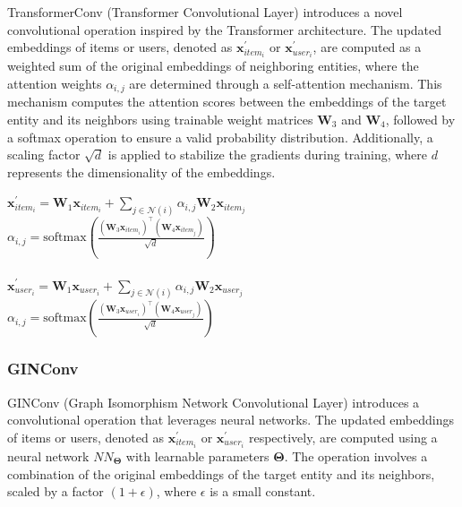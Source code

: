 \documentclass{scrartcl}
\begin{document}
\quad TransformerConv (Transformer Convolutional Layer) introduces a novel convolutional operation inspired by the Transformer\cite{transformer} architecture. The updated embeddings of items or users, denoted as $\mathbf{x}^{\prime}_{item_i}$ or $\mathbf{x}^{\prime}_{user_i}$, are computed as a weighted sum of the original embeddings of neighboring entities, where the attention weights $\alpha_{i,j}$ are determined through a self-attention mechanism. This mechanism computes the attention scores between the embeddings of the target entity and its neighbors using trainable weight matrices $\mathbf{W}_3$ and $\mathbf{W}_4$, followed by a softmax operation to ensure a valid probability distribution. Additionally, a scaling factor $\sqrt{d}$ is applied to stabilize the gradients during training, where $d$ represents the dimensionality of the embeddings. \\ 

\begin{center}
    $\mathbf{x}^{\prime}_{item_{i}} = \mathbf{W}_1 \mathbf{x}_{item_{i}} + \sum_{j \in \mathcal{N}(i)} \alpha_{i,j} \mathbf{W}_2 \mathbf{x}_{item_{j}}$ \\
    $\alpha_{i,j} = \textrm{softmax} \left( \frac{(\mathbf{W}_3\mathbf{x}_{item_{i}})^{\top} (\mathbf{W}_4\mathbf{x}_{item_{j}})} {\sqrt{d}} \right)$ \\~\\
    $\mathbf{x}^{\prime}_{user_{i}} = \mathbf{W}_1 \mathbf{x}_{user_{i}} + \sum_{j \in \mathcal{N}(i)} \alpha_{i,j} \mathbf{W}_2 \mathbf{x}_{user_{j}}$ \\
    $\alpha_{i,j} = \textrm{softmax} \left( \frac{(\mathbf{W}_3\mathbf{x}_{user_{i}})^{\top} (\mathbf{W}_4\mathbf{x}_{user_{j}})} {\sqrt{d}} \right)$ 
\end{center}

\subsubsection{GINConv\cite{ginconv}} 

\quad GINConv (Graph Isomorphism Network Convolutional Layer) introduces a convolutional operation that leverages neural networks. The updated embeddings of items or users, denoted as $\mathbf{x}^{\prime}_{item_i}$ or $\mathbf{x}^{\prime}_{user_i}$ respectively, are computed using a neural network $NN_{\mathbf{\Theta}}$ with learnable parameters $\mathbf{\Theta}$. The operation involves a combination of the original embeddings of the target entity and its neighbors, scaled by a factor $(1 + \epsilon)$, where $\epsilon$ is a small constant. \\ 
\end{document}

